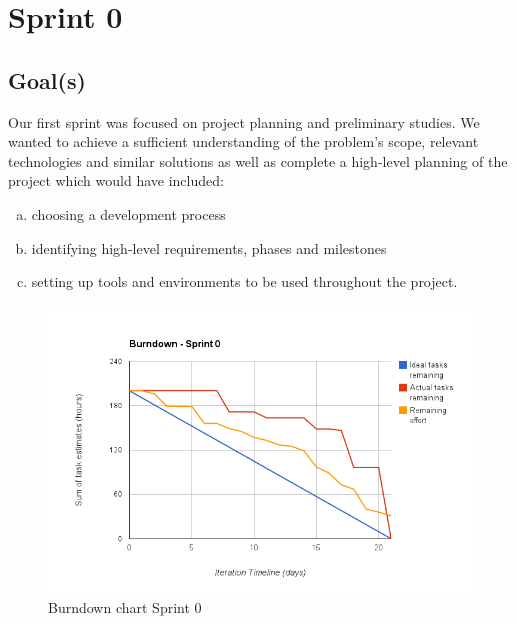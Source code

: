 \chapter{Sprint 0}
\label{Sprint0}

\section{Goal(s)}
Our first sprint was focused on project planning and preliminary studies.
We wanted to achieve a sufficient understanding of the problem's scope,
relevant technologies and similar solutions as well as complete a high-level planning of
the project which would have included:
\begin{enumerate}[a)]
\item choosing a development process
\item identifying high-level requirements, phases and milestones
\item setting up tools and environments to be used throughout the project.
\end{enumerate}

\begin{figure}[H]
\centering
\includegraphics[scale=0.50]{../Figures/burndownSprint0.png}
\caption{Burndown chart Sprint 0}
\label{figure:burndownsprint0}
\end{figure}


